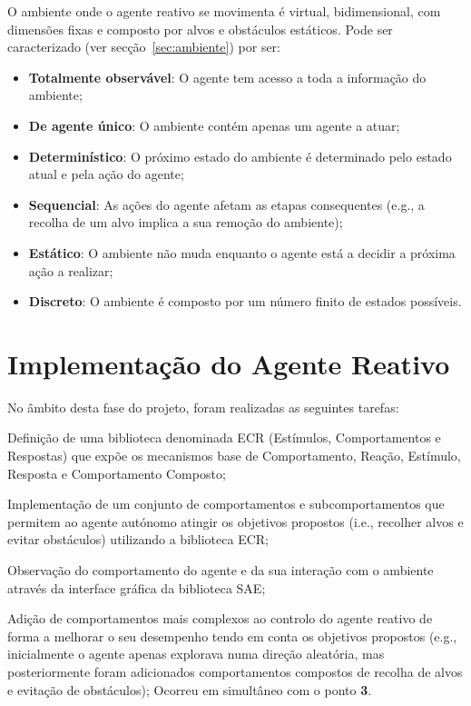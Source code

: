 O ambiente onde o agente reativo se movimenta é virtual, bidimensional, com dimensões fixas e composto por alvos e obstáculos estáticos. Pode ser caracterizado (ver secção~\ref{sec:ambiente}) por ser:

\begin{itemize}
    \item \textbf{Totalmente observável}: O agente tem acesso a toda a informação do ambiente;
    \item \textbf{De agente único}: O ambiente contém apenas um agente a atuar;
    \item \textbf{Determinístico}: O próximo estado do ambiente é determinado pelo estado atual e pela ação do agente;
    \item \textbf{Sequencial}: As ações do agente afetam as etapas consequentes (e.g., a recolha de um alvo implica a sua remoção do ambiente);
    \item \textbf{Estático}: O ambiente não muda enquanto o agente está a decidir a próxima ação a realizar;
    \item \textbf{Discreto}: O ambiente é composto por um número finito de estados possíveis.
\end{itemize}


\section{Implementação do Agente Reativo}\label{sec:implementacao-agente-reativo}

No âmbito desta fase do projeto, foram realizadas as seguintes tarefas:

\begin{boldenumerate}
    \item Definição de uma biblioteca denominada ECR (Estímulos, Comportamentos e Respostas) que expõe os mecanismos base de Comportamento, Reação, Estímulo, Resposta e Comportamento Composto;
    \item Implementação de um conjunto de comportamentos e subcomportamentos que permitem ao agente autónomo atingir os objetivos propostos (i.e., recolher alvos e evitar obstáculos) utilizando a biblioteca ECR;
    \item Observação do comportamento do agente e da sua interação com o ambiente através da interface gráfica da biblioteca SAE;
    \item Adição de comportamentos mais complexos ao controlo do agente reativo de forma a melhorar o seu desempenho tendo em conta os objetivos propostos (e.g., inicialmente o agente apenas explorava numa direção aleatória, mas posteriormente foram adicionados comportamentos compostos de recolha de alvos e evitação de obstáculos); Ocorreu em simultâneo com o ponto \textbf{3}.
\end{boldenumerate}

